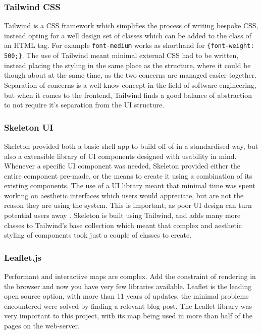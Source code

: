 \subsubsection{Tailwind CSS}
\label{ssse:tailwind}
Tailwind is a CSS framework which simplifies the process of writing bespoke CSS, instead opting for a well design set of classes which can be added to the class of an HTML tag. For example \texttt{font-medium} works as shorthand for \texttt{\{font-weight: 500;\}}. The use of Tailwind meant minimal external CSS had to be written, instead placing the styling in the same place as the structure, where it could be though about at the same time, as the two concerns are managed easier together. Separation of concerns is a well know concept in the field of software engineering, but when it comes to the frontend, Tailwind finds a good balance of abstraction to not require it's separation from the UI structure.

\subsubsection{Skeleton UI}
\label{ssse:skeleton}
Skeleton provided both a basic shell app to build off of in a standardised way, but also a extensible library of UI components designed with usability in mind. Whenever a specific UI component was needed, Skeleton provided either the entire component pre-made, or the means to create it using a combination of its existing components. The use of a UI library meant that minimal time was spent working on aesthetic interfaces which users would appreciate, but are not the reason they are using the system. This is important, as poor UI design can turn potential users away \cite{}. Skeleton is built using Tailwind, and adds many more classes to Tailwind's base collection which meant that complex and aesthetic styling of components took just a couple of classes to create.

\subsubsection{Leaflet.js}
\label{ssse:leafletjs}
Performant and interactive maps are complex. Add the constraint of rendering in the browser and now you have very few libraries available. Leaflet is the leading open source option, with more than 11 years of updates, the minimal problems encountered were solved by finding a relevant blog post. The Leaflet library was very important to this project, with its map being used in more than half of the pages on the web-server.

